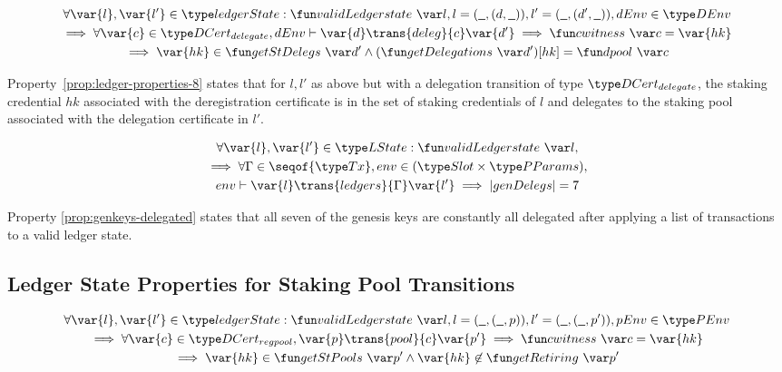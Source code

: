 \begin{property}
  \begin{multline*}
    \forall \var{l}, \var{l'} \in \ledgerState: \applyFun{validLedgerstate}{l},
    l = (\wcard, (d,\wcard)), l' = (\wcard, (d',\wcard)), dEnv\in\DEnv \\
    \implies \forall \var{c} \in \DCertDeleg, dEnv \vdash\var{d}
    \trans{deleg}{c} \var{d'} \implies \applyFun{cwitness}{c} = \var{hk}\\
    \implies \var{hk} \in \applyFun{getStDelegs}{d'} \wedge
    (\applyFun{getDelegations}{d'})[hk] = \applyFun{dpool}{c}
  \end{multline*}
  \label{prop:ledger-properties-8}
\end{property}

Property~\ref{prop:ledger-properties-8} states that for $l, l'$ as above but
with a delegation transition of type $\DCertDeleg$, the staking credential $hk$
associated with the deregistration certificate is in the set of staking
credentials of $l$ and delegates to the staking pool associated with the
delegation certificate in $l'$.

\begin{property}
  \label{prop:genkeys-delegated}
  \begin{multline*}
    \forall \var{l}, \var{l'} \in \LState: \applyFun{validLedgerstate}{l},\\
    \implies \forall \Gamma \in \seqof{\Tx}, env \in (\Slot \times \PParams), \\
    env \vdash\var{l} \trans{ledgers}{\Gamma} \var{l'} \implies |genDelegs| = 7
  \end{multline*}
\end{property}

Property \ref{prop:genkeys-delegated} states that all seven of the genesis keys
are constantly all delegated after applying a list of transactions to a valid ledger
state.

\subsection{Ledger State Properties for Staking Pool Transitions}
\label{sec:ledg-state-prop}

\begin{property}
  \begin{multline*}
    \forall \var{l}, \var{l'} \in \ledgerState: \applyFun{validLedgerstate}{l},
    l = (\wcard, (\wcard, p)), l' = (\wcard, (\wcard, p')), pEnv\in\PEnv \\
    \implies \forall \var{c} \in \DCertRegPool, \var{p} \trans{pool}{c} \var{p'}
    \implies \applyFun{cwitness}{c} = \var{hk}\\ \implies
    \var{hk}\in\applyFun{getStPools}{p'} \wedge \var{hk} \not\in
    \applyFun{getRetiring}{p'}
  \end{multline*}
  \label{prop:ledger-properties-9}
\end{property}

